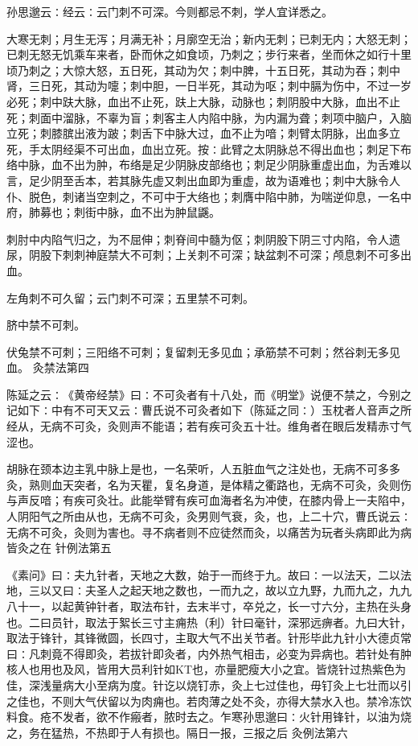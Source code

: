 \documentclass[a4paper,12pt,UTF8,twoside]{ctexbook}
\begin{document}
孙思邈云∶经云∶云门刺不可深。今则都忌不刺，学人宜详悉之。

大寒无刺；月生无泻；月满无补；月廓空无治；新内无刺；已刺无内；大怒无刺；已刺无怒无饥乘车来者，卧而休之如食顷，乃刺之；步行来者，坐而休之如行十里顷乃刺之；大惊大怒，五日死，其动为欠；刺中脾，十五日死，其动为吞；刺中肾，三日死，其动为嚏；刺中胆，一日半死，其动为呕；刺中膈为伤中，不过一岁必死；刺中趺大脉，血出不止死，趺上大脉，动脉也；刺阴股中大脉，血出不止死；刺面中溜脉，不辜为盲；刺客主人内陷中脉，为内漏为聋；刺项中脑户，入脑立死；刺膝膑出液为跛；刺舌下中脉大过，血不止为喑；刺臂太阴脉，出血多立死，手太阴经渠不可出血，血出立死。按∶此臂之太阴脉总不得出血也；刺足下布络中脉，血不出为肿，布络是足少阴脉皮部络也；刺足少阴脉重虚出血，为舌难以言，足少阴至舌本，若其脉先虚又刺出血即为重虚，故为语难也；刺中大脉令人仆、脱色，刺诸当空刺之，不可中于大络也；刺膺中陷中肺，为喘逆仰息，一名中府，肺募也；刺街中脉，血不出为肿鼠鼷。

刺肘中内陷气归之，为不屈伸；刺脊间中髓为伛；刺阴股下阴三寸内陷，令人遗尿，阴股下刺刺神庭禁大不可刺；上关刺不可深；缺盆刺不可深；颅息刺不可多出血。

左角刺不可久留；云门刺不可深；五里禁不可刺。

脐中禁不可刺。

伏兔禁不可刺；三阳络不可刺；复留刺无多见血；承筋禁不可刺；然谷刺无多见血。
灸禁法第四

陈延之云∶《黄帝经禁》曰∶不可灸者有十八处，而《明堂》说便不禁之，今别之记如下∶中有不可天又云∶曹氏说不可灸者如下（陈延之同∶）玉枕者人音声之所经从，无病不可灸，灸则声不能语；若有疾可灸五十壮。维角者在眼后发精赤寸气涩也。

胡脉在颈本边主乳中脉上是也，一名荣听，人五脏血气之注处也，无病不可多多灸，熟则血天突者，名为天瞿，复名身道，是体精之衢路也，无病不可灸，灸则伤与声反喑；有疾可灸壮。此能举臂有疾可血海者名为冲使，在膝内骨上一夫陷中，人阴阳气之所由从也，无病不可灸，灸男则气衰，灸，也，上二十穴，曹氏说云∶无病不可灸，灸则为害也。寻不病者则不应徒然而灸，以痛苦为玩者头病即此为病皆灸之在
针例法第五

《素问》曰∶夫九针者，天地之大数，始于一而终于九。故曰∶一以法天，二以法地，三以又曰∶夫圣人之起天地之数也，一而九之，故以立九野，九而九之，九九八十一，以起黄钟针者，取法布针，去末半寸，卒兑之，长一寸六分，主热在头身也。二曰员针，取法于絮长三寸主痈热（利）针曰毫针，深邪远痹者。九曰大针，取法于锋针，其锋微圆，长四寸，主取大气不出关节者。针形毕此九针小大德贞常曰∶凡刺竟不得即灸，若拔针即灸者，内外热气相击，必变为异病也。若针处有肿核人也用也及风，皆用大员利针如KT也，亦量肥瘦大小之宜。皆烧针过热紫色为佳，深浅量病大小至病为度。针讫以烧钉赤，灸上七过佳也，毋钉灸上七壮而以引之佳也，不则大气伏留以为肉痈也。若肉薄之处不灸，亦得大禁水入也。禁冷冻饮料食。疮不发者，欲不作瘢者，脓时去之。乍寒孙思邈曰∶火针用锋针，以油为烧之，务在猛热，不热即于人有损也。隔日一报，三报之后
灸例法第六
\end{document}
